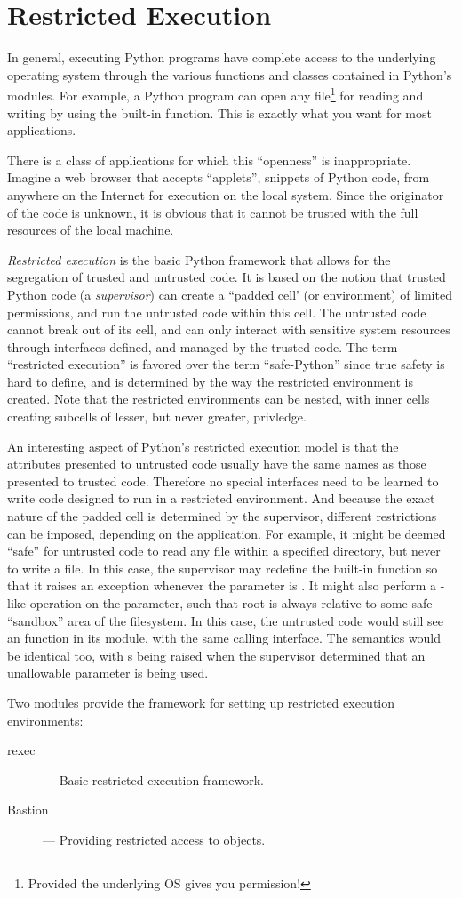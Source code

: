 \chapter{Restricted Execution}

In general, executing Python programs have complete access to the
underlying operating system through the various functions and classes
contained in Python's modules.  For example, a Python program can open
any file\footnote{Provided the underlying OS gives you permission!}
for reading and writing by using the
 built-in function.  This is exactly what you want for
most applications.

There is a class of applications for which this ``openness'' is
inappropriate.  Imagine a web browser that accepts ``applets'', snippets of
Python code, from anywhere on the Internet for execution on the local
system.  Since the originator of the code is unknown, it is obvious that it
cannot be trusted with the full resources of the local machine.

\emph{Restricted execution} is the basic Python framework that allows
for the segregation of trusted and untrusted code.  It is based on the
notion that trusted Python code (a \emph{supervisor}) can create a
``padded cell' (or environment) of limited permissions, and run the
untrusted code within this cell.  The untrusted code cannot break out
of its cell, and can only interact with sensitive system resources
through interfaces defined, and managed by the trusted code.  The term
``restricted execution'' is favored over the term ``safe-Python''
since true safety is hard to define, and is determined by the way the
restricted environment is created.  Note that the restricted
environments can be nested, with inner cells creating subcells of
lesser, but never greater, privledge.

An interesting aspect of Python's restricted execution model is that
the attributes presented to untrusted code usually have the same names
as those presented to trusted code.  Therefore no special interfaces
need to be learned to write code designed to run in a restricted
environment.  And because the exact nature of the padded cell is
determined by the supervisor, different restrictions can be imposed,
depending on the application.  For example, it might be deemed
``safe'' for untrusted code to read any file within a specified
directory, but never to write a file.  In this case, the supervisor
may redefine the built-in
 function so that it raises an exception whenever the
 parameter is .  It might also perform a
-like operation on the  parameter, such
that root is always relative to some safe ``sandbox'' area of the
filesystem.  In this case, the untrusted code would still see an
 function in its  module, with the same
calling interface.  The semantics would be identical too, with
s being raised when the supervisor determined that an
unallowable parameter is being used.

Two modules provide the framework for setting up restricted execution
environments:

\begin{description}

\item[rexec]
--- Basic restricted execution framework.

\item[Bastion]
--- Providing restricted access to objects.

\end{description}
